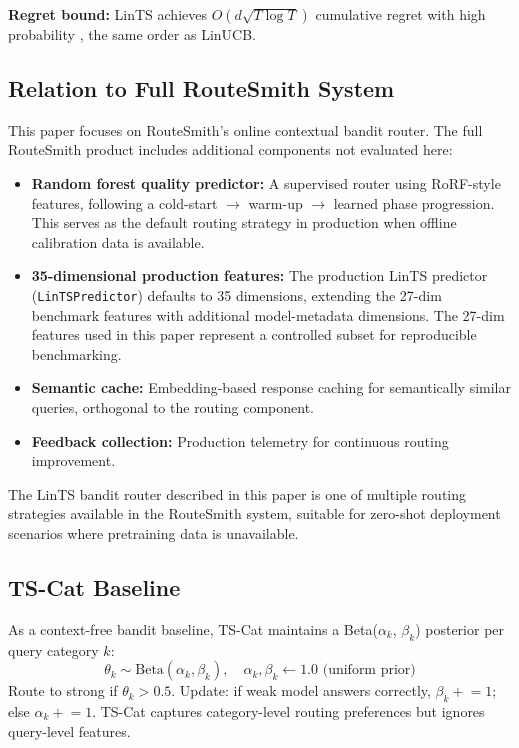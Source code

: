 \textbf{Regret bound:} LinTS achieves $O(d\sqrt{T \log T})$ cumulative regret with high probability \citep{abeille2017linear}, the same order as LinUCB.

\subsection{Relation to Full RouteSmith System}
\label{sec:product}

This paper focuses on RouteSmith's online contextual bandit router. The full RouteSmith product \citep{routesmith2025system} includes additional components not evaluated here:
\begin{itemize}
    \item \textbf{Random forest quality predictor:} A supervised router using RoRF-style features, following a cold-start $\rightarrow$ warm-up $\rightarrow$ learned phase progression. This serves as the default routing strategy in production when offline calibration data is available.
    \item \textbf{35-dimensional production features:} The production LinTS predictor (\texttt{LinTSPredictor}) defaults to 35 dimensions, extending the 27-dim benchmark features with additional model-metadata dimensions. The 27-dim features used in this paper represent a controlled subset for reproducible benchmarking.
    \item \textbf{Semantic cache:} Embedding-based response caching for semantically similar queries, orthogonal to the routing component.
    \item \textbf{Feedback collection:} Production telemetry for continuous routing improvement.
\end{itemize}
The LinTS bandit router described in this paper is one of multiple routing strategies available in the RouteSmith system, suitable for zero-shot deployment scenarios where pretraining data is unavailable.

\subsection{TS-Cat Baseline}
\label{sec:tscat}

As a context-free bandit baseline, TS-Cat maintains a Beta($\alpha_k$, $\beta_k$) posterior per query category $k$:
\begin{equation}
\theta_k \sim \text{Beta}(\alpha_k, \beta_k), \quad \alpha_k, \beta_k \leftarrow 1.0 \text{ (uniform prior)}
\end{equation}
Route to strong if $\theta_k > 0.5$. Update: if weak model answers correctly, $\beta_k \mathrel{+}= 1$; else $\alpha_k \mathrel{+}= 1$. TS-Cat captures category-level routing preferences but ignores query-level features.
